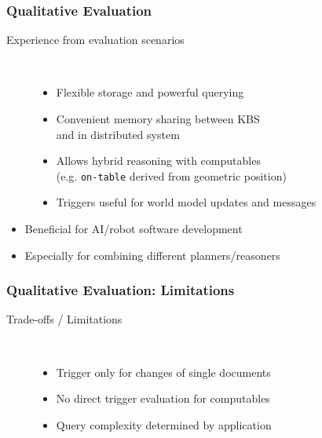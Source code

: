 \begin{frame}
  \frametitle{Qualitative Evaluation}
  \begin{description}
  \item[Experience from evaluation scenarios]%
                \hfill \\
    \begin{itemize}
    \item Flexible storage and powerful querying
    \item Convenient memory sharing between KBS\\ and in distributed system
    \item Allows hybrid reasoning with computables\\(e.g. \texttt{on-table} derived from geometric position)
    \item Triggers useful for world model updates and messages
    \end{itemize}
  \end{description}
  \pause
\begin{block}{}%
  \begin{itemize}
  \item Beneficial for AI/robot software development
  \item Especially for combining different planners/reasoners
  \end{itemize}
  \end{block}
\end{frame}

\begin{frame}
  \frametitle{Qualitative Evaluation: Limitations}
  \begin{description}
  \item[Trade-offs / Limitations]
                \hfill \\
\bigskip
    \begin{itemize}
    \item Trigger only for changes of single documents %
\vspace{0.15cm}
    \item No direct trigger evaluation for computables %
\vspace{0.15cm}
    \item Query complexity determined by application %
    \end{itemize}
  \end{description}
\end{frame}

